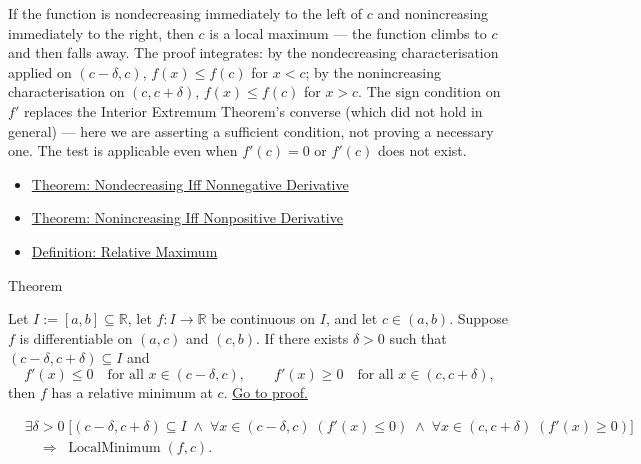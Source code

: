\begin{remark*}[Interpretation]
If the function is nondecreasing immediately to the left of $c$ and nonincreasing immediately to the right, then $c$ is a local maximum --- the function climbs to $c$ and then falls away. The proof integrates: by the nondecreasing characterisation applied on $(c-\delta,c)$, $f(x) \leq f(c)$ for $x < c$; by the nonincreasing characterisation on $(c,c+\delta)$, $f(x) \leq f(c)$ for $x > c$. The sign condition on $f'$ replaces the Interior Extremum Theorem's converse (which did not hold in general) --- here we are asserting a sufficient condition, not proving a necessary one. The test is applicable even when $f'(c) = 0$ or $f'(c)$ does not exist.
\end{remark*}

\begin{dependencies}
\begin{itemize}
  \item \hyperref[thm:nondecreasing-iff-nonneg-derivative]{Theorem: Nondecreasing Iff Nonnegative Derivative}
  \item \hyperref[thm:nonincreasing-iff-nonpos-derivative]{Theorem: Nonincreasing Iff Nonpositive Derivative}
  \item \hyperref[def:relative-maximum]{Definition: Relative Maximum}
\end{itemize}
\end{dependencies}


\begin{theorembox}{Theorem}
\begin{theorem}
\label{thm:first-derivative-test-minimum}
Let $I := [a,b] \subseteq \mathbb{R}$, let $f : I \to \mathbb{R}$ be continuous on $I$, and let $c \in (a,b)$. Suppose $f$ is differentiable on $(a,c)$ and $(c,b)$. If there exists $\delta > 0$ such that $(c-\delta,c+\delta) \subseteq I$ and
\[
f'(x) \leq 0 \quad \text{for all } x \in (c-\delta,c),
\qquad
f'(x) \geq 0 \quad \text{for all } x \in (c,c+\delta),
\]
then $f$ has a relative minimum at $c$.
\hyperref[prf:first-derivative-test-minimum]{Go to proof.}
\end{theorem}
\end{theorembox}

\begin{remark*}
\begin{align*}
&\exists \delta > 0\;\bigl[(c-\delta,c+\delta)\subseteq I
\;\land\;
\forall x\in(c-\delta,c)\;(f'(x)\leq 0)
\;\land\;
\forall x\in(c,c+\delta)\;(f'(x)\geq 0)\bigr]\\
&\quad\Rightarrow\; \operatorname{LocalMinimum}(f,c).
\end{align*}
\end{remark*}

